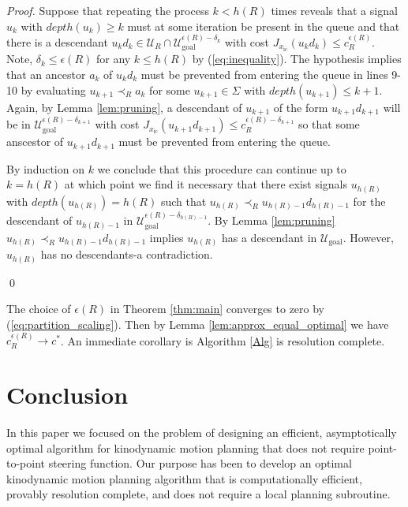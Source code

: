 \documentclass{llncs}
\newcommand{\mcmargin}[2]{{\color{red}#1}\marginpar{\raggedright\footnotesize\color{red}[MC] #2}}
\begin{document}
\begin{proof}
Suppose that repeating the process $k<h(R)$ times reveals that a signal $u_k$ with $depth(u_k)\geq k$ must at some iteration be present in the queue and that there is a descendant  $u_kd_k\in\mathcal{U}_R\cap\mathcal{U}_\mathrm{goal}^{\epsilon(R)-\delta_k}$  with cost $J_{x_\mathrm{ic}}(u_kd_k)\leq c_R^{\epsilon(R)}$.
%
Note, $\delta_k \leq \epsilon(R) $ for any $k \leq h(R)$ by (\ref{eq:inequality}).
%
The hypothesis implies that an ancestor $a_{k}$ of $u_kd_k$ must be prevented from entering the queue in lines 9-10 by evaluating $u_{k+1}\prec_R a_{k}$ for some $u_{k+1}\in \Sigma$ with $depth(u_{k+1})\leq k+1$. 
%
Again, by Lemma \ref{lem:pruning}, a descendant of $u_{k+1}$ of the form $u_{k+1}d_{k+1}$ will be in $\mathcal{U}^{\epsilon(R)-\delta_{k+1}}_\mathrm{goal}$ with cost $J_{x_\mathrm{ic}}(u_{k+1}d_{k+1})\leq c_R^{\epsilon(R)-\delta_{k+1}}$ so that some anscestor of $u_{k+1}d_{k+1}$ must be prevented from entering the queue. 

By induction on $k$ we conclude that this procedure can continue up to $k=h(R)$ at which point we find it necessary that there exist signals $u_{h(R)}$ with $depth(u_{h(R)})= h(R)$ such that $u_{h(R)}\prec_R u_{h(R)-1}d_{h(R)-1}$ for the descendant of $u_{h(R)-1}$ in $\mathcal{U}^{\epsilon(R)-\delta_{h(R)-1}}_\mathrm{goal}$. By Lemma \ref{lem:pruning} $u_{h(R)}\prec_R u_{h(R)-1}d_{h(R)-1}$ implies $u_{h(R)}$ has a descendant in $\mathcal{U}_\mathrm{goal}$. However, $u_{h(R)}$ has no descendants-a contradiction.   


\qed
\end{proof}
%

The choice of $\epsilon(R)$ in Theorem \ref{thm:main} converges to zero by  (\ref{eq:partition_scaling}).
%
Then by Lemma \ref{lem:approx_equal_optimal} we have $c_{R}^{\epsilon(R)}\rightarrow c^{*}$. 
%
 An immediate corollary is Algorithm \ref{Alg} is resolution complete.

\section{Conclusion\label{sec:Conclusions}}
%

\mcmargin{In this paper we focused on the problem of designing an efficient, asymptotically optimal algorithm for kinodynamic motion planning that does not require point-to-point steering function.}{}
Our purpose has been to develop an optimal kinodynamic motion planning algorithm that is computationally efficient, provably resolution complete, and does not require a \mcmargin{local planning subroutine}{point-to-point steering function}. 
\end{document}
